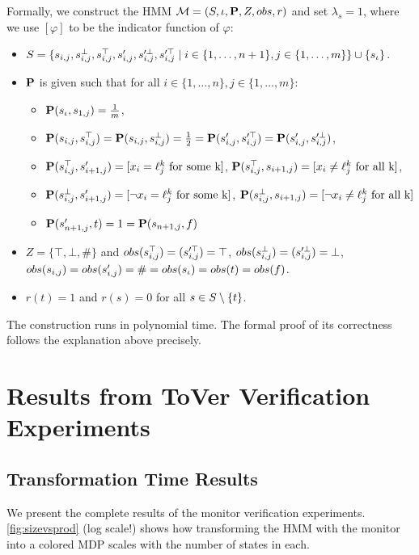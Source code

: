 \documentclass[runningheads]{llncs}
\newcommand{\indicator}[1]{[#1]}
\newcommand{\Obs}{Z}
\newcommand{\alg}{ToVer\xspace}
\begin{document}
{Formally, we construct the HMM $\mc = (\Sts,\init, \ptrans, \Obs, \obsf, r)$ and set $\lambda_s = 1$, where we use $[\varphi]$ to be the indicator function of $\varphi$:
\begin{itemize}
    \item
          $S = \{ s_{i,j}, s_{i,j}^\bot, s_{i,j}^\top,
              s_{i,j}', s_{i,j}'^\bot, s_{i,j}'^\top
              \mid i \in \{1, \dots, n+1 \},  j \in \{ 1, \dots, m \} \} \cup \{ s_\iota \}$.
    \item $\mathbf{P}$ is given such that for all $i \in \{1,\dots, n\}, j \in \{1, \dots, m\}$:
          \begin{itemize}
              \item  $\mathbf{P}(s_\iota,s_{1,j}) = \frac{1}{m}$,
              \item  $\mathbf{P}(s_{i,j},s_{i,j}^\top) = \mathbf{P}(s_{i,j},s_{i,j}^\bot) = \frac{1}{2}= \mathbf{P}(s'_{i,j},s_{i,j}'^\top) = \mathbf{P}(s_{i,j}',s_{i,j}'^
                        \bot)$,
              \item $\ptrans(s_{i,j}^\top,s'_{i+1,j}) = \indicator{x_i = \ell_j^k \text{ for some k}}$, $\ptrans(s_{i,j}^\top,s_{i+1,j}) = \indicator{x_i \neq \ell_j^k \text{ for all k}}$,
              \item $\ptrans(s_{i,j}^\bot,s'_{i+1,j}) = \indicator{\neg x_i = \ell_j^k \text{ for some k}}$, $\ptrans(s_{i,j}^\bot,s_{i+1,j}) = \indicator{\neg x_i \neq \ell_j^k \text{ for all k}}$
              \item $\mathbf{P}(s'_{n+1,j}, t) = 1 = \mathbf{P}(s_{n+1,j}, f)$
          \end{itemize}
    \item $\Obs = \{\top, \bot, \#\}$ and ${obs}(s_{i,j}^\top) = (s_{i,j}'^\top) = \top$,
          ${obs}(s_{i,j}^\bot) = (s_{i,j}'^\bot) = \bot$,
          ${obs}(s_{i,j}) = {obs}(s'_{i,j}) = \# = {obs}(s_\iota) = {obs}(t) = {obs}(f)$.
    \item $r(t) = 1$ and $r(s) = 0$ for all $s \in S \setminus \{ t\}$.
\end{itemize}
The construction runs in polynomial time. The formal proof of its correctness follows the explanation above precisely.


\section{Results from \alg Verification Experiments} \label{sec:resverify}
\subsection{Transformation Time Results}\label{app:transtimeres}
We present the complete results of the monitor verification experiments. \cref{fig:sizevsprod} (log scale!) shows how transforming the HMM with the monitor into a colored MDP scales with the number of states in each.
}
\end{document}
